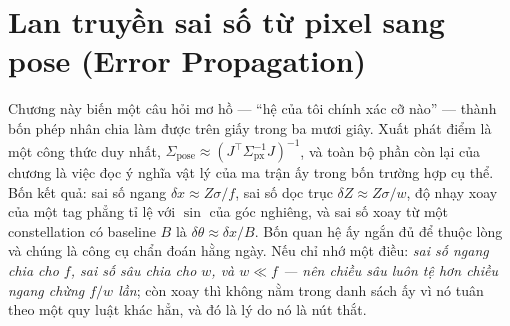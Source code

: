 \documentclass[../../marker.tex]{subfiles}
\begin{document}
\chapter{Lan truyền sai số từ pixel sang pose (Error Propagation)}

\begin{tomtat}
Chương này biến một câu hỏi mơ hồ --- ``hệ của tôi chính xác cỡ nào'' --- thành bốn phép nhân chia làm được trên giấy trong ba mươi giây. Xuất phát điểm là một công thức duy nhất, \(\Sigma_{\text{pose}} \approx (J^{\top}\Sigma_{\text{px}}^{-1}J)^{-1}\), và toàn bộ phần còn lại của chương là việc đọc ý nghĩa vật lý của ma trận ấy trong bốn trường hợp cụ thể. Bốn kết quả: sai số ngang \(\delta x \approx Z\sigma/f\), sai số dọc trục \(\delta Z \approx Z\sigma/w\), độ nhạy xoay của một tag phẳng tỉ lệ với \(\sin\) của góc nghiêng, và sai số xoay từ một constellation có baseline \(B\) là \(\delta\theta \approx \delta x/B\). Bốn quan hệ ấy ngắn đủ để thuộc lòng và chúng là công cụ chẩn đoán hằng ngày. Nếu chỉ nhớ một điều: \emph{sai số ngang chia cho \(f\), sai số sâu chia cho \(w\), và \(w \ll f\) --- nên chiều sâu luôn tệ hơn chiều ngang chừng \(f/w\) lần}; còn xoay thì không nằm trong danh sách ấy vì nó tuân theo một quy luật khác hẳn, và đó là lý do nó là nút thắt.
\end{tomtat}
\end{document}
